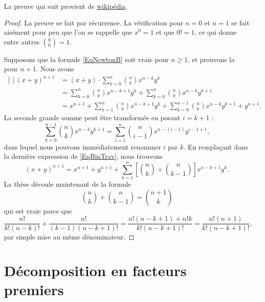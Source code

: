 La preuve qui suit provient de \href{http://fr.wikipedia.org/wiki/Formule_du_binôme_de_Newton}{wikipédia}.
\begin{proof}
    La preuve se fait par récurrence. La vérification pour $n=0$ et $n=1$ se fait aisément pour peu que l'on se rappelle que \( x^0=1\) et que \( 0!=1\), ce qui donne entre autres \( {0\choose 0}=1\).
    
    Supposons que la formule \eqref{EqNewtonB} soit vraie pour $n\geq1$, et prouvons la pour $n+1$. Nous avons
\begin{equation}        \label{EqBinTrav}
    \begin{aligned}[]
        (x+y)^{n+1} &=(x+y)\cdot  \sum_{k=0}^n{n\choose k}x^{n-k}y^k\\
                &= \sum_{k=0}^n{n\choose k}x^{n-k+1}y^k+\sum_{k=0}^n{n\choose k}x^{n-k}y^{k+1}\\
                &=x^{n+1}+ \sum_{k=1}^n{n\choose k}x^{n-k+1}y^k+\sum_{k=0}^{n-1}{n\choose k}x^{n-k}y^{k+1}+y^{n+1}.
    \end{aligned}
\end{equation}
La seconde grande somme peut être transformée en posant $i=k+1$ :
\begin{equation}
    \sum_{k=0}^{n-1}{n\choose k}x^{n-k}y^{k+1}  =\sum_{i=1}^n{n\choose i-1}x^{n-(i-1)}y^{i-1+1},
\end{equation}
dans lequel nous pouvons immédiatement renommer $i$ par $k$. En remplaçant dans la dernière expression de \eqref{EqBinTrav}, nous trouvons
\begin{equation}
    (x+y)^{n+1}=x^{n+1}+y^{n+1}+\sum_{k=1}^n\left[ {n\choose k}+{n\choose k-1} \right]x^{n-k+1}y^k.
\end{equation}
La thèse découle maintenant de la formule
\begin{equation}
    {n\choose k}+{n\choose k-1}={n+1\choose k}
\end{equation}
qui est vraie parce que
\begin{equation}
    \frac{ n! }{ k!(n-k)! }+\frac{ n! }{ (k-1)(n-k+1)! }=\frac{ n!(n-k+1)+n!k }{ k!(n-k+1)! }=\frac{ n!(n+1) }{  k!(n-k+1)!  },
\end{equation}
par simple mise au même dénominateur.
\end{proof}

\section{Décomposition en facteurs premiers}

